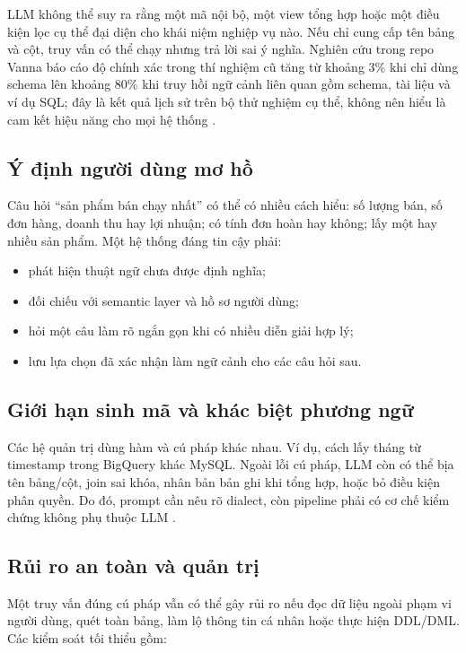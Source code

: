 \documentclass[12pt,a4paper]{article}
\begin{document}
LLM không thể suy ra rằng một mã nội bộ, một view tổng hợp hoặc một điều kiện
lọc cụ thể đại diện cho khái niệm nghiệp vụ nào. Nếu chỉ cung cấp tên bảng
và cột, truy vấn có thể chạy nhưng trả lời sai ý nghĩa. Nghiên cứu trong repo
Vanna báo cáo độ chính xác trong thí nghiệm cũ tăng từ khoảng 3\% khi chỉ
dùng schema lên khoảng 80\% khi truy hồi ngữ cảnh liên quan gồm schema, tài
liệu và ví dụ SQL; đây là kết quả lịch sử trên bộ thử nghiệm cụ thể, không
nên hiểu là cam kết hiệu năng cho mọi hệ thống \cite{vannapaper2023}.

\subsection{Ý định người dùng mơ hồ}

Câu hỏi ``sản phẩm bán chạy nhất'' có thể có nhiều cách hiểu: số lượng bán,
số đơn hàng, doanh thu hay lợi nhuận; có tính đơn hoàn hay không; lấy một hay
nhiều sản phẩm. Một hệ thống đáng tin cậy phải:

\begin{itemize}
  \item phát hiện thuật ngữ chưa được định nghĩa;
  \item đối chiếu với semantic layer và hồ sơ người dùng;
  \item hỏi một câu làm rõ ngắn gọn khi có nhiều diễn giải hợp lý;
  \item lưu lựa chọn đã xác nhận làm ngữ cảnh cho các câu hỏi sau.
\end{itemize}

\subsection{Giới hạn sinh mã và khác biệt phương ngữ}

Các hệ quản trị dùng hàm và cú pháp khác nhau. Ví dụ, cách lấy tháng từ
timestamp trong BigQuery khác MySQL. Ngoài lỗi cú pháp, LLM còn có thể bịa
tên bảng/cột, join sai khóa, nhân bản bản ghi khi tổng hợp, hoặc bỏ điều kiện
phân quyền. Do đó, prompt cần nêu rõ dialect, còn pipeline phải có cơ chế
kiểm chứng không phụ thuộc LLM \cite{google2025}.

\subsection{Rủi ro an toàn và quản trị}

Một truy vấn đúng cú pháp vẫn có thể gây rủi ro nếu đọc dữ liệu ngoài phạm
vi người dùng, quét toàn bảng, làm lộ thông tin cá nhân hoặc thực hiện DDL/DML.
Các kiểm soát tối thiểu gồm:
\end{document}
